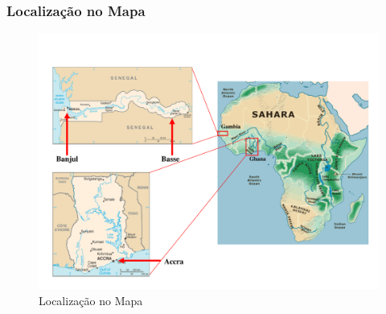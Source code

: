 \begin{frame}
  \frametitle{Localização no Mapa}
  \begin{figure}[H]
    \centering
    \caption{Localização no Mapa}
    \includegraphics[scale=0.35]{../../../inputs/zheng_images/africa_ghana.pdf}
  \end{figure}
\end{frame}

